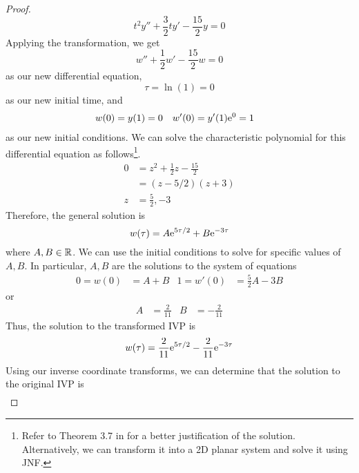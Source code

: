 \documentclass[../psets.tex]{subfiles}
\begin{document}
\begin{enumerate}
\begin{proof}
        \begin{equation*}
            t^2y''+\frac{3}{2}ty'-\frac{15}{2}y = 0
        \end{equation*}
        Applying the transformation, we get
        \begin{equation*}
            w''+\frac{1}{2}w'-\frac{15}{2}w = 0
        \end{equation*}
        as our new differential equation,
        \begin{equation*}
            \tau = \ln(1) = 0
        \end{equation*}
        as our new initial time, and
        \begin{align*}
            w(0) &= y(1) = 0&
            w'(0) &= y'(1)\e[0] = 1
        \end{align*}
        as our new initial conditions. We can solve the characteristic polynomial for this differential equation as follows\footnote{Refer to Theorem 3.7 in \textcite{bib:Teschl} for a better justification of the solution. Alternatively, we can transform it into a 2D planar system and solve it using JNF.}.
        \begin{align*}
            0 &= z^2+\frac{1}{2}z-\frac{15}{2}\\
            &= (z-5/2)(z+3)\\
            z &= \frac{5}{2},-3
        \end{align*}
        Therefore, the general solution is
        \begin{equation*}
            w(\tau) = A\e[5\tau/2]+B\e[-3\tau]
        \end{equation*}
        where $A,B\in\R$. We can use the initial conditions to solve for specific values of $A,B$. In particular, $A,B$ are the solutions to the system of equations
        \begin{align*}
            0 = w(0)  &= A+B&
            1 = w'(0) &= \frac{5}{2}A-3B
        \end{align*}
        or
        \begin{align*}
            A &= \frac{2}{11}&
            B &= -\frac{2}{11}
        \end{align*}
        Thus, the solution to the transformed IVP is
        \begin{equation*}
            w(\tau) = \frac{2}{11}\e[5\tau/2]-\frac{2}{11}\e[-3\tau]
        \end{equation*}
        Using our inverse coordinate transforms, we can determine that the solution to the original IVP is
        \begin{align*}

\end{align*}
\end{proof}
\end{enumerate}
\end{document}
